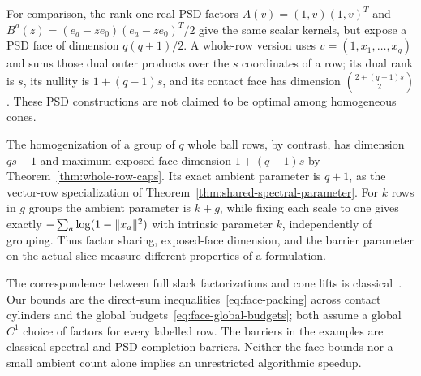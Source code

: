 For comparison, the rank-one real PSD factors
$A(v)=(1,v)(1,v)^T$ and
$B^a(z)=(e_a-ze_0)(e_a-ze_0)^T/2$ give the same scalar kernels,
but expose a PSD face of dimension $q(q+1)/2$. A whole-row version
uses $v=(1,x_1,\ldots,x_q)$ and sums those dual outer products over
the $s$ coordinates of a row; its dual rank is $s$, its nullity is
$1+(q-1)s$, and its contact face has dimension
$\binom{2+(q-1)s}{2}$. These PSD constructions are not claimed to be
optimal among homogeneous cones.

The homogenization of a group of $q$ whole ball rows, by contrast,
has dimension $qs+1$ and maximum exposed-face dimension $1+(q-1)s$
by Theorem~\ref{thm:whole-row-caps}. Its exact ambient parameter is
$q+1$, as the vector-row specialization of
Theorem~\ref{thm:shared-spectral-parameter}. For $k$ rows in $g$
groups the ambient parameter is $k+g$, while fixing each scale to
one gives exactly $-\sum_a\log(1-\lVert x_a\rVert^2)$ with intrinsic
parameter $k$, independently of grouping. Thus factor sharing,
exposed-face dimension, and the barrier parameter on the actual slice
measure different properties of a formulation.

The correspondence between full slack factorizations and cone lifts is
classical~\cite{GPT2013}. Our bounds are the direct-sum
inequalities~\eqref{eq:face-packing} across contact cylinders and the
global budgets~\eqref{eq:face-global-budgets}; both assume a global
$C^1$ choice of factors for every labelled row. The barriers in the
examples are classical spectral and PSD-completion barriers. Neither the
face bounds nor a small ambient count alone implies an unrestricted
algorithmic speedup.
